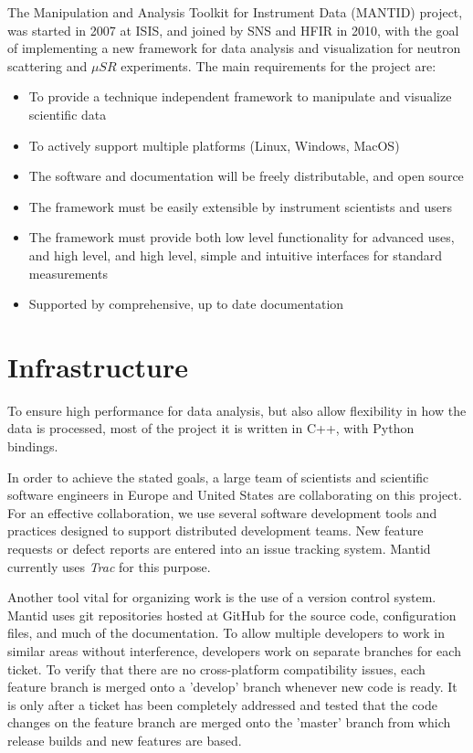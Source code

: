 \documentclass{elsarticle}
\begin{document}
The Manipulation and Analysis Toolkit for Instrument Data (MANTID) project, was started in 2007 at ISIS, and joined by SNS and HFIR in 2010, with the goal of implementing a new framework for data analysis and visualization for neutron scattering and $\mu SR$ experiments. The main requirements for the project are:
\begin{itemize}
\item To provide a technique independent framework to manipulate and visualize scientific data 
\item To actively support multiple platforms (Linux, Windows, MacOS)
\item The software and documentation will be freely distributable, and open source
\item The framework must be easily extensible by instrument scientists and users
\item The framework must provide both low level functionality for advanced uses, and high level, and high level, simple and intuitive interfaces for standard measurements 
\item Supported by comprehensive, up to date documentation
\end{itemize}
 


\section{Infrastructure}
\label{infrastructure}
To ensure high performance for data analysis, but also allow flexibility in how the data is processed, most of the project it is written in C++, with Python bindings.
 
In order to achieve the stated goals, a large team of scientists and scientific software engineers in Europe and United States are collaborating on this project. For an effective collaboration, we use several software development tools and practices designed to support distributed development teams. New feature requests or defect reports are entered into an issue tracking system. Mantid currently uses  \textit{Trac} \cite{trac} for this purpose.
 
Another tool vital for organizing work is the use of a version control system. Mantid uses git \cite{git} repositories hosted at GitHub \cite{github} for the source code, configuration files, and much of the documentation. To allow multiple developers to work in similar areas without interference, developers work on separate branches for each ticket. To verify that there are no cross-platform compatibility issues, each feature branch is merged onto a 'develop' branch whenever new code is ready. It is only after a ticket has been completely addressed and tested that the code changes on the feature branch are merged onto the 'master' branch from which release builds and new features are based.
\end{document}
